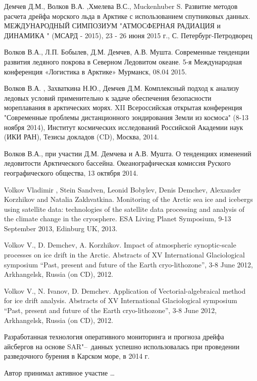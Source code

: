 Демчев Д.М., Волков В.А. ,Хмелева В.С., Muckenhuber S. Развитие методов расчета дрейфа морского льда в Арктике с использованием спутниковых данных.
МЕЖДУНАРОДНЫЙ СИМПОЗИУМ "АТМОСФЕРНАЯ РАДИАЦИЯ и ДИНАМИКА " (МСАРД - 2015), 23 - 26 июня 2015 г., С. Петербург-Петродворец

Волков В.А., Л.П. Бобылев, Д.М. Демчев, А.В. Мушта. Современные тенденции развития ледяного покрова в Северном Ледовитом океане. 5-я Международная конференция «Логистика в Арктике» Мурманск, 08.04 2015.

Волков В.А. , Захваткина Н.Ю., Демчев Д.М. Комплексный подход к анализу ледовых условий применительно к задаче обеспечения безопасности мореплавания в арктических морях. XII Всероссийская открытая конференция "Современные проблемы дистанционного зондирования Земли из космоса" (8-13 ноября 2014), Институт космических исследований Российской Академии наук (ИКИ РАН), Тезисы докладов (CD), Москва, 2014. 

Волков В.А., при участии Д.М. Демчева и А.В. Мушта. О тенденциях изменений ледовитости Арктического бассейна. Океанографическая комиссия Руского географического общества, 13 октября 2014.

Volkov Vladimir , Stein Sandven, Leonid Bobylev, Denis Demchev, Alexander Korzhikov and Natalia Zakhvatkina. Monitoring of the Arctic sea ice and icebergs using satellite data: technologies of the satellite data processing and analysis of the climate change in the cryosphere. ESA Living Planet Symposium, 9-13 September 2013, Edinburg UK, 2013.

Volkov V., D. Demchev, A. Korzhikov. Impact of atmospheric synoptic-scale processes on ice drift in the Arctic. Abstracts of XV International Glaciological symposium “Past, present and future of the Earth cryo-lithozone”, 3-8 June 2012, Arkhangelsk, Russia (on CD), 2012.

Volkov V., N. Ivanov, D. Demchev. Application of Vectorial-algebraical method for ice drift analysis. Abstracts of XV International Glaciological symposium “Past, present and future of the Earth cryo-lithozone”, 3-8 June 2012, Arkhangelsk, Russia (on CD), 2012.

Разработанная технология оперативного мониторинга и прогноза дрейфа айсбергов на основе SAR"--~данных успешно использовалась при проведении разведочного бурения в Карском море, в 2014 г.

{\contribution} Автор принимал активное участие \ldots


